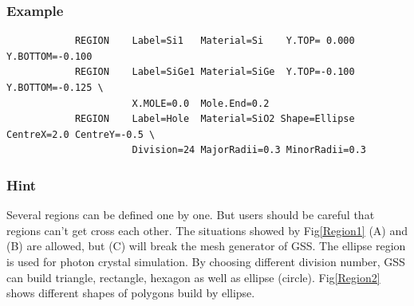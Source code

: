 \documentclass[11pt,pdftex]{article}
\begin{document}
\subsubsection*{Example}
\begin{verbatim}
            REGION    Label=Si1   Material=Si    Y.TOP= 0.000  Y.BOTTOM=-0.100
            REGION    Label=SiGe1 Material=SiGe  Y.TOP=-0.100  Y.BOTTOM=-0.125 \
                      X.MOLE=0.0  Mole.End=0.2
            REGION    Label=Hole  Material=SiO2 Shape=Ellipse CentreX=2.0 CentreY=-0.5 \
                      Division=24 MajorRadii=0.3 MinorRadii=0.3
\end{verbatim}

\subsubsection*{Hint}
Several regions can be defined one by one. But users should be
careful that regions can't get cross each other. The situations
showed by Fig\ref{Region1} (A) and (B) are allowed, but (C) will
break the mesh generator of GSS. The ellipse region is used for
photon crystal simulation. By choosing different division number,
GSS can build triangle, rectangle, hexagon as well as ellipse
(circle). Fig\ref{Region2} shows different shapes of polygons build
by ellipse.
\end{document}
